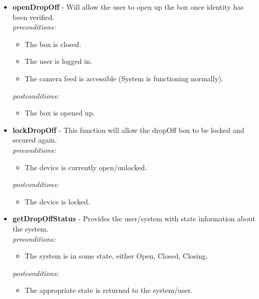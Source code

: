 \documentclass[a4paper,12pt]{article}
\begin{document}
	\begin{itemize}
		\item \textbf{openDropOff} - Will allow the user to open up the box once identity has been verified.\\[0.5cm]
		\textit{preconditions:}
		\begin{itemize}
			\item The box is closed.
			\item The user is logged in.
			\item The camera feed is accessible (System is functioning normally).
		\end{itemize}
		
		\textit{postconditions:}
		\begin{itemize}
			\item The box is opened up.\\[0.5cm]
		\end{itemize}
		
		\item \textbf{lockDropOff} -  This function will allow the dropOff box to be locked and secured again.\\[0.5cm]
		\textit{preconditions:}
		\begin{itemize}
			\item The device is currently open/unlocked.
		\end{itemize}
		
		\textit{postconditions:}
		\begin{itemize}
			\item The device is locked.\\[0.5cm]
		\end{itemize}
		
		\item \textbf{getDropOffStatus} -  Provides the user/system with state information about the system.\\[0.5cm]
		\textit{preconditions:}
		\begin{itemize}
			\item The system is in some state, either Open, Closed, Closing.
		\end{itemize}
		
		\textit{postconditions:}
		\begin{itemize}
			\item The appropriate state is returned to the system/user.\\[0.5cm]
		\end{itemize}
	\end{itemize}
	\newpage
	
\end{document}
